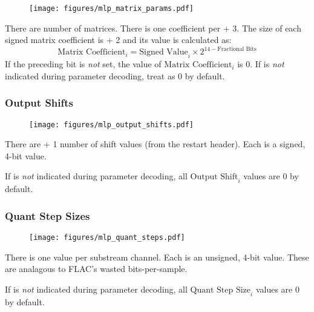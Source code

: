 \begin{figure}[h]
\texttt{[image: figures/mlp\_matrix\_params.pdf]}
\end{figure}
\par
\noindent
There are  number of matrices.
There is one coefficient per  + 3.
The size of each signed matrix coefficient is  + 2
and its value is calculated as:
\begin{equation*}
\text{Matrix Coefficient}_i = \text{Signed Value}_i \times 2 ^ {14 - \text{Fractional Bits}}
\end{equation*}
If the preceding  bit is \textit{not} set,
the value of $\text{Matrix Coefficient}_i$ is 0.
If  is \textit{not} indicated during parameter decoding,
treat  as 0 by default.

\subsubsection{Output Shifts}


\begin{figure}[h]
\texttt{[image: figures/mlp\_output\_shifts.pdf]}
\end{figure}
\par
\noindent
There are  + 1 number of shift values
(from the restart header).
Each is a signed, 4-bit value.
\par
If  is \textit{not} indicated during parameter
decoding, all $\text{Output Shift}_i$ values are 0 by default.


\subsubsection{Quant Step Sizes}

\begin{figure}[h]
\texttt{[image: figures/mlp\_quant\_steps.pdf]}
\end{figure}
\par
\noindent
There is one  value per substream channel.
Each is an unsigned, 4-bit value.
These are analagous to FLAC's wasted bits-per-sample.
\par
If  is \textit{not} indicated during parameter
decoding, all $\text{Quant Step Size}_i$ values are 0 by default.

